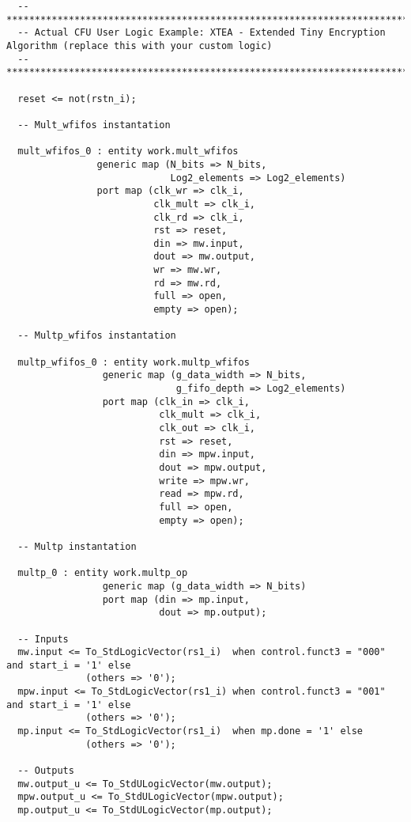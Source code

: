 \begin{code}
\begin{verbatim}
  -- **************************************************************************************************************************
  -- Actual CFU User Logic Example: XTEA - Extended Tiny Encryption Algorithm (replace this with your custom logic)
  -- **************************************************************************************************************************

  reset <= not(rstn_i);

  -- Mult_wfifos instantation

  mult_wfifos_0 : entity work.mult_wfifos
                generic map (N_bits => N_bits,
                             Log2_elements => Log2_elements)
                port map (clk_wr => clk_i,
                          clk_mult => clk_i,
                          clk_rd => clk_i,
                          rst => reset,
                          din => mw.input,
                          dout => mw.output,
                          wr => mw.wr,
                          rd => mw.rd,
                          full => open,
                          empty => open);

  -- Multp_wfifos instantation

  multp_wfifos_0 : entity work.multp_wfifos
                 generic map (g_data_width => N_bits,
                              g_fifo_depth => Log2_elements)
                 port map (clk_in => clk_i,
                           clk_mult => clk_i,
                           clk_out => clk_i,
                           rst => reset,
                           din => mpw.input,
                           dout => mpw.output,
                           write => mpw.wr,
                           read => mpw.rd,
                           full => open,
                           empty => open);

  -- Multp instantation

  multp_0 : entity work.multp_op
                 generic map (g_data_width => N_bits)
                 port map (din => mp.input,
                           dout => mp.output);

  -- Inputs
  mw.input <= To_StdLogicVector(rs1_i)  when control.funct3 = "000" and start_i = '1' else
              (others => '0');
  mpw.input <= To_StdLogicVector(rs1_i) when control.funct3 = "001" and start_i = '1' else
              (others => '0');
  mp.input <= To_StdLogicVector(rs1_i)  when mp.done = '1' else
              (others => '0');

  -- Outputs
  mw.output_u <= To_StdULogicVector(mw.output);
  mpw.output_u <= To_StdULogicVector(mpw.output);
  mp.output_u <= To_StdULogicVector(mp.output);


\end{verbatim}
\end{code}
